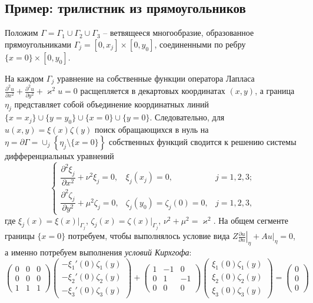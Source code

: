 \subsection{Пример: трилистник из прямоугольников}\label{sec:ch5/sect3/subsect1}
Положим $\Gamma = \Gamma_1 \cup \Gamma_2 \cup \Gamma_3$ -- ветвящееся многообразие, образованное прямоугольниками $\Gamma_j = [0, x_j] \times [0, y_0]$, соединенными по ребру $\{x=0\} \times [0, y_0]$.

На каждом $\Gamma_j$ уравнение на собственные функции оператора Лапласа $\frac{\partial^2 u}{\partial x^2} + \frac{\partial^2 u}{\partial y^2} + \varkappa^2 u=0$ расщепляется в декартовых координатах $(x, y)$, а граница $\eta_j$ представляет собой объединение координатных линий $\{x=x_j\} \cup \{y=y_0\} \cup \{x=0\} \cup \{y=0\}$. Следовательно, для $u(x,y) = \xi(x) \zeta(y)$ поиск обращающихся в нуль на $\eta = \partial \Gamma = \cup_j \left\{ \eta_j \setminus \{x=0\} \right\}$ собственных функций сводится к решению системы дифференциальных уравнений 
\begin{equation}
\left\{
\begin{array}{lll}
\dfrac{\partial^2 \xi_j}{\partial x^2}  + \nu^2 \xi_j = 0 , & \xi_j(x_j) = 0, & j=1,2,3; 	\\
\dfrac{\partial^2 \zeta_j}{\partial y^2}  + \mu^2 \zeta_j = 0 , & \zeta_j(y_0) = \zeta_j(0) = 0, & j=1,2,3,
\end{array}
\right.
\label{eq:rectangularSystem}
\end{equation}
где $\xi_j(x) = \left. \xi(x) \right|_{\Gamma_j}$, $\zeta_j(x) = \left. \zeta(x) \right|_{\Gamma_j}$, $\nu^2 + \mu^2 = \varkappa^2$.
На общем сегменте границы $\{x=0\}$ потребуем, чтобы выполнялось условие вида  $Z \left. \frac{\partial u}{\partial n} \right|_\eta + A \left. u \right|_\eta = 0$, а именно потребуем выполнения \textit{условий Кирхгофа}:
\begin{equation}
\begin{pmatrix}
0	&	0	&	0	\\
0	&	0	&	0	\\
1	&	1	&	1
\end{pmatrix} 
\begin{pmatrix}
-\xi_1' (0)	\zeta_1(y) \\
-\xi_2' (0)	\zeta_2(y) \\
-\xi_3' (0)	\zeta_3(y) 
\end{pmatrix} + 
\begin{pmatrix}
1	&	-1	&	0	\\
0	&	1	&	-1	\\
0	&	0	&	0
\end{pmatrix} 
\begin{pmatrix}
\xi_1(0)	\zeta_1(y) \\
\xi_2(0)	\zeta_2(y) \\
\xi_3(0)	\zeta_3(y) 
\end{pmatrix} = 
\begin{pmatrix}
0	\\	0	\\	0
\end{pmatrix} 
\label{eq:rectanglesKirchhoffCondition}
\end{equation}

